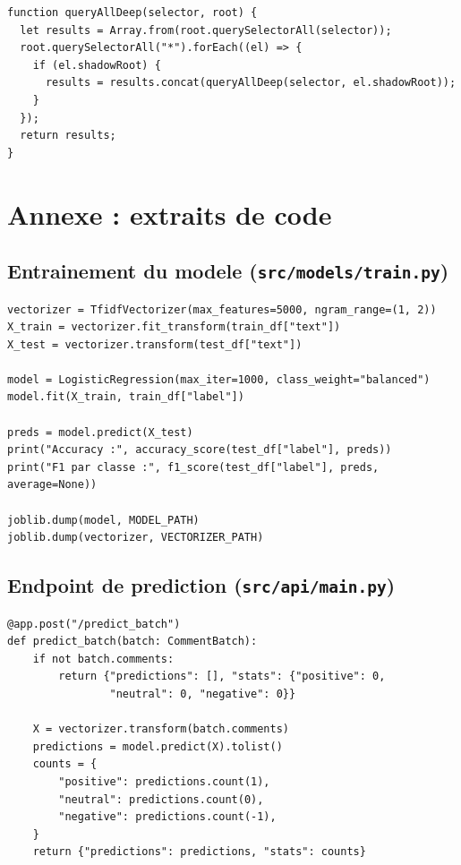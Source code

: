 \documentclass[11pt,a4paper]{article}
\begin{document}
\begin{verbatim}
function queryAllDeep(selector, root) {
  let results = Array.from(root.querySelectorAll(selector));
  root.querySelectorAll("*").forEach((el) => {
    if (el.shadowRoot) {
      results = results.concat(queryAllDeep(selector, el.shadowRoot));
    }
  });
  return results;
}
\end{verbatim}
\label{lst:shadow}

\section{Annexe : extraits de code}

\subsection{Entrainement du modele (\texttt{src/models/train.py})}

\begin{verbatim}
vectorizer = TfidfVectorizer(max_features=5000, ngram_range=(1, 2))
X_train = vectorizer.fit_transform(train_df["text"])
X_test = vectorizer.transform(test_df["text"])

model = LogisticRegression(max_iter=1000, class_weight="balanced")
model.fit(X_train, train_df["label"])

preds = model.predict(X_test)
print("Accuracy :", accuracy_score(test_df["label"], preds))
print("F1 par classe :", f1_score(test_df["label"], preds, average=None))

joblib.dump(model, MODEL_PATH)
joblib.dump(vectorizer, VECTORIZER_PATH)
\end{verbatim}

\subsection{Endpoint de prediction (\texttt{src/api/main.py})}

\begin{verbatim}
@app.post("/predict_batch")
def predict_batch(batch: CommentBatch):
    if not batch.comments:
        return {"predictions": [], "stats": {"positive": 0,
                "neutral": 0, "negative": 0}}

    X = vectorizer.transform(batch.comments)
    predictions = model.predict(X).tolist()
    counts = {
        "positive": predictions.count(1),
        "neutral": predictions.count(0),
        "negative": predictions.count(-1),
    }
    return {"predictions": predictions, "stats": counts}
\end{verbatim}
\end{document}
